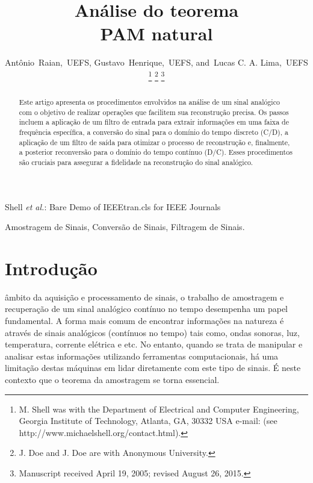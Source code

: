 \documentclass[]{IEEEtran}
\begin{document}
\title{Análise do teorema\\ PAM natural}

\author{Antônio~Raian,~UEFS,
        Gustavo~Henrique,~UEFS,
        and~Lucas C. A. Lima,~UEFS%
\thanks{M. Shell was with the Department
of Electrical and Computer Engineering, Georgia Institute of Technology, Atlanta,
GA, 30332 USA e-mail: (see http://www.michaelshell.org/contact.html).}%
\thanks{J. Doe and J. Doe are with Anonymous University.}%
\thanks{Manuscript received April 19, 2005; revised August 26, 2015.}}


%
{Shell \MakeLowercase{\textit{et al.}}: Bare Demo of IEEEtran.cls for IEEE Journals}

\maketitle

\begin{abstract}
Este artigo apresenta os procedimentos envolvidos na análise de um sinal analógico com o objetivo de realizar operações que facilitem sua reconstrução precisa. Os passos incluem a aplicação de um filtro de entrada para extrair informações em uma faixa de frequência específica, a conversão do sinal para o domínio do tempo discreto (C/D), a aplicação de um filtro de saída para otimizar o processo de reconstrução e, finalmente, a posterior reconversão para o domínio do tempo contínuo (D/C). Esses procedimentos são cruciais para assegurar a fidelidade na reconstrução do sinal analógico.
\end{abstract}

\begin{IEEEkeywords}
Amostragem de Sinais, Conversão de Sinais, Filtragem de Sinais.
\end{IEEEkeywords}


\IEEEpeerreviewmaketitle



\section{Introdução}

 âmbito da aquisição e processamento de sinais, o trabalho de amostragem e recuperação de um sinal analógico contínuo no tempo desempenha um papel fundamental. A forma mais comum de encontrar informações na natureza é através de sinais analógicos (contínuos no tempo) tais como, ondas sonoras, luz, temperatura, corrente elétrica e etc. No entanto, quando se trata de manipular e analisar estas informações utilizando ferramentas computacionais, há uma limitação destas máquinas em lidar diretamente com este tipo de sinais. É neste contexto que o teorema da amostragem se torna essencial. 
\end{document}
